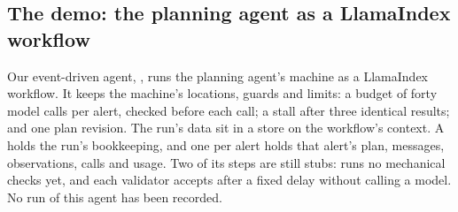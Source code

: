 \subsection{The demo: the planning agent as a LlamaIndex workflow}
\label{sec:events-demo}

Our event-driven agent, , runs the planning agent's machine as a
LlamaIndex workflow. It keeps the machine's locations, guards and limits: a budget of forty model
calls per alert, checked before each call; a stall after three identical results; and one plan
revision. The run's data sit in a store on the workflow's context. A  holds the
run's bookkeeping, and one  per alert holds that alert's plan, messages,
observations, calls and usage. Two of its steps are still stubs:  runs no
mechanical checks yet, and each validator accepts after a fixed delay without calling a model. No
run of this agent has been recorded.

